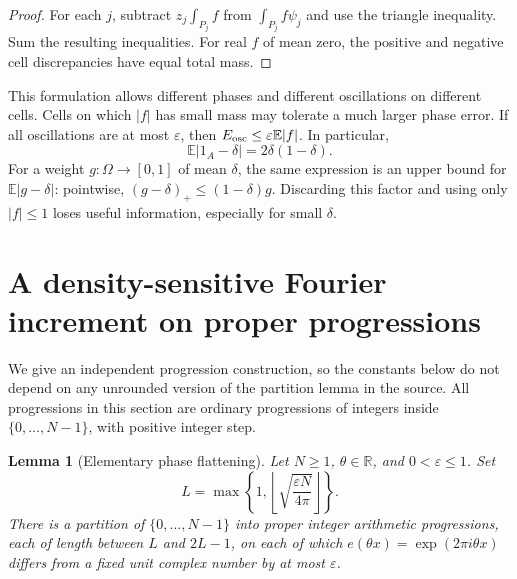 \documentclass[11pt,letterpaper]{article}
\numberwithin{equation}{section}
\newtheorem{lemma}[theorem]{Lemma}
\theoremstyle{definition}
\theoremstyle{remark}
\newcommand{\E}{\mathbb E}
\newcommand{\R}{\mathbb R}
\newcommand{\1}{\mathbf 1}
\newcommand{\srctag}[1]{\texorpdfstring{\enspace\textup{[#1]}}{ [#1]}}
\newcommand{\srcnote}[2]{\par\noindent{\small\textit{Source #1, delivered #2.}}\par}
\begin{document}
\begin{proof}
For each $j$, subtract $z_j\int_{P_j}f$ from
$\int_{P_j}f\psi_j$ and use the triangle inequality. Sum the resulting
inequalities. For real $f$ of mean zero, the positive and negative cell
discrepancies have equal total mass.
\end{proof}

This formulation allows different phases and different oscillations on
different cells. Cells on which $|f|$ has small mass may tolerate a much
larger phase error. If all oscillations are at most $\varepsilon$, then
$E_{\rm osc}\le\varepsilon\E|f|$. In particular,
\begin{equation}
 \E|1_A-\delta|=2\delta(1-\delta).
 \label{gsr:dt:03:selection:lone}
\end{equation}
For a weight $g\colon\Omega\to[0,1]$ of mean $\delta$, the same expression
is an upper bound for $\E|g-\delta|$: pointwise,
$(g-\delta)_+\le(1-\delta)g$.
Discarding this factor and using only $|f|\le1$ loses useful information,
especially for small $\delta$.

\section[{A density-sensitive Fourier increment on proper progressions\srctag{03}}]{A density-sensitive Fourier increment on proper progressions}\label{gsr:dt:03:sec:d4}
\srcnote{03}{Section 4}
\label{gsr:dt:03:sec:fourier}

We give an independent progression construction, so the constants below do
not depend on any unrounded version of the partition lemma in the source.
All progressions in this section are ordinary progressions of integers
inside $\{0,\ldots,N-1\}$, with positive integer step.

\begin{lemma}[Elementary phase flattening]
\label{gsr:dt:03:phase:flatten}
Let $N\ge1$, $\theta\in\R$, and $0<\varepsilon\le1$. Set
\[
 L=\max\left\{1,\left\lfloor\sqrt{\frac{\varepsilon N}{4\pi}}
                  \right\rfloor\right\}.
\]
There is a partition of $\{0,\ldots,N-1\}$ into proper integer
arithmetic progressions, each of length between $L$ and $2L-1$, on each
of which $e(\theta x)=\exp(2\pi i\theta x)$ differs from a fixed unit
complex number by at most $\varepsilon$.
\end{lemma}
\end{document}
